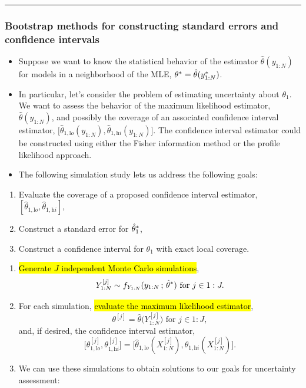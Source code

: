 \documentclass[]{article}
\providecommand{\tightlist}{%
  \setlength{\itemsep}{0pt}\setlength{\parskip}{0pt}}
\begin{document}
\begin{center}\rule{0.5\linewidth}{\linethickness}\end{center}

\subsubsection{Bootstrap methods for constructing standard errors and
confidence
intervals}\label{bootstrap-methods-for-constructing-standard-errors-and-confidence-intervals}

\begin{itemize}
\item
  Suppose we want to know the statistical behavior of the estimator
  \(\hat\theta({y_{1:N}})\) for models in a neighborhood of the MLE,
  \(\theta^*=\hat\theta(y_{1:N}^*)\).
\item
  In particular, let's consider the problem of estimating uncertainty
  about \(\theta_1\). We want to assess the behavior of the maximum
  likelihood estimator, \(\hat\theta({y_{1:N}})\), and possibly the
  coverage of an associated confidence interval estimator,
  \(\big[\hat\theta_{1,\mathrm lo}({y_{1:N}}),\hat\theta_{1,\mathrm hi}({y_{1:N}})\big]\).
  The confidence interval estimator could be constructed using either
  the Fisher information method or the profile likelihood approach.
\item
  The following simulation study lets us address the following goals: 
\end{itemize}

\begin{enumerate}
\def\labelenumi{(\Alph{enumi})}
\tightlist
\item
  Evaluate the coverage of a proposed confidence interval estimator,
  \([\hat\theta_{1,\mathrm lo},\hat\theta_{1,\mathrm hi}]\), 
\item
  Construct a standard error for \(\hat\theta_1^*\), 
\item
  Construct a confidence interval for \(\theta_1\) with exact local
  coverage.
\end{enumerate}

\begin{enumerate}
\def\labelenumi{\arabic{enumi}.}
\item
  \hl{Generate $J$ independent Monte Carlo simulations},
  \[Y_{1:N}^{[j]} \sim f_{Y_{1:N}}(y_{1:N}\, ; \,\hat\theta^*)\mbox{ for } j\in 1:J.\]
\item
  For each simulation, \hl{evaluate the maximum likelihood estimator},
  \[ \theta^{[j]} = \hat\theta\big(Y_{1:N}^{[j]}\big)\mbox{ for } j\in 1:J,\]
  and, if desired, the confidence interval estimator,
  \[ \big[\theta^{[j]}_{1,\mathrm lo},\theta^{[j]}_{1,\mathrm hi}\big] = \big[\hat\theta_{1,\mathrm lo}({X^{[j]}_{1:N}}),\hat\theta_{1,\mathrm hi}({X^{[j]}_{1:N}})\big].\]
\item
  We can use these simulations to obtain solutions to our goals for
  uncertainty assessment: 
\end{enumerate}
\end{document}
